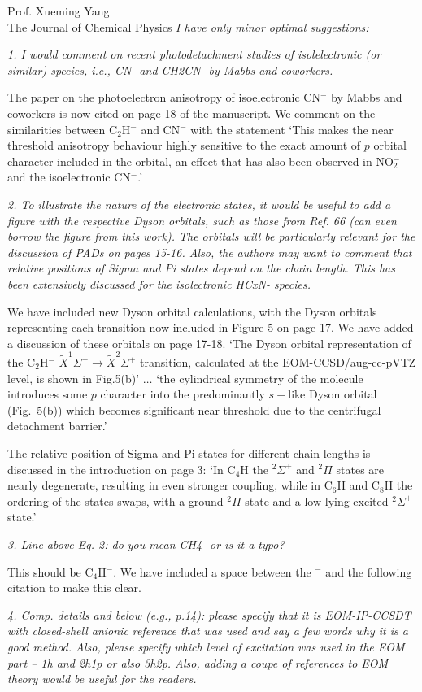 \documentclass[a4paper,12pt]{letter}
\begin{document}
\begin{sf}
\begin{letter}{%
Prof. Xueming Yang\\
The Journal of Chemical Physics
}
\emph{I have only minor optimal suggestions:}

\emph{1. I would comment on recent photodetachment studies of isolelectronic (or similar) species, i.e., CN- and CH2CN- by Mabbs and coworkers.}

The paper on the photoelectron anisotropy of isoelectronic CN$^-$ by Mabbs and coworkers is now cited on page 18 of the manuscript. We comment on the similarities between C$_2$H$^-$ and CN$^-$ with the statement `This makes the near threshold anisotropy behaviour highly sensitive to the exact amount of $p$ orbital character included in the orbital, an effect that has also been observed in NO$_2^-$ and the isoelectronic CN$^-$.'

\emph{2. To illustrate the nature of the electronic states, it would be useful to add a figure with the respective Dyson orbitals, such as those from Ref. 66 (can even borrow the figure from this work). The orbitals will be particularly relevant for the discussion of PADs on pages 15-16. 	Also, the authors may want to comment that relative positions of Sigma and Pi states depend on the chain length. This has been extensively discussed for the isolectronic HCxN- species.}

We have included new Dyson orbital calculations, with the Dyson orbitals representing each transition now included in Figure 5 on page 17. We have added a discussion of these orbitals on page 17-18. `The Dyson orbital representation of the C$_2$H$^-$ $\tilde{X}^1\Sigma^+\rightarrow\tilde{X}^2\Sigma^+$ transition, calculated at the EOM-CCSD/aug-cc-pVTZ level, is shown in Fig.5(b)' $\dots$ `the cylindrical symmetry of the molecule introduces some $p$ character into the predominantly $s-$like Dyson orbital (Fig.~5(b)) which becomes significant near threshold due to the centrifugal detachment barrier.'

The relative position of Sigma and Pi states for different chain lengths is discussed in the introduction on page 3: `In C$_4$H the $^2\Sigma^+$ and $^2\Pi$ states are nearly degenerate, resulting in even stronger coupling, while in C$_6$H and C$_8$H the ordering of the states swaps, with a ground $^2\Pi$ state and a low lying excited $^2\Sigma^+$ state.'

\emph{3. Line above Eq. 2: do you mean CH4- or is it a typo?}

This should be C$_4$H$^-$. We have included a space between the $^-$ and the following citation to make this clear.

\emph{4. Comp. details and below (e.g., p.14): please specify that it is EOM-IP-CCSDT with closed-shell anionic reference that was used and say a few words why it is a good method. Also, please specify which level of excitation was used in the EOM part -- 1h and 2h1p or also 3h2p. Also, adding a coupe of references to EOM theory would be useful for the readers.}


\end{letter}
\end{sf}
\end{document}
